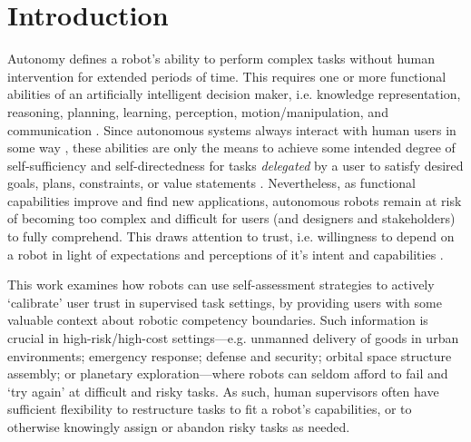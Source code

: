 \section{Introduction}


Autonomy defines a robot's %
ability to perform complex tasks without human intervention for extended periods of time. This requires one or more functional abilities of an artificially intelligent decision maker, i.e. knowledge representation, reasoning, planning, learning, perception, motion/manipulation, and communication \cite{Russell2010-wv}. 
Since autonomous systems always interact with human users in some way \cite{Bradshaw2013-ck}, these abilities are only the means to achieve some intended degree of self-sufficiency and self-directedness for tasks \emph{delegated} by a user to satisfy desired goals, plans, constraints, or value statements \cite{Miller2014-av}. Nevertheless, as functional capabilities improve and find new applications, autonomous robots remain at risk of becoming too complex and difficult for users (and designers and stakeholders) to fully comprehend.  
This draws attention to trust, i.e. willingness to depend on a robot in light of expectations and perceptions of it's intent and capabilities \cite{Israelsen2019-to}. 

This work examines how robots can use self-assessment strategies to actively `calibrate' user trust in supervised task settings, by providing users with some valuable context about robotic competency boundaries. %
Such information is crucial in high-risk/high-cost settings---e.g. unmanned delivery of goods in urban environments; emergency response; defense and security; orbital space structure assembly; or planetary exploration---where robots can seldom afford to fail and `try again' at difficult and risky tasks. %
As such, human supervisors often have sufficient flexibility to restructure tasks to fit a robot's capabilities, or to otherwise knowingly assign or abandon risky tasks as needed. 

